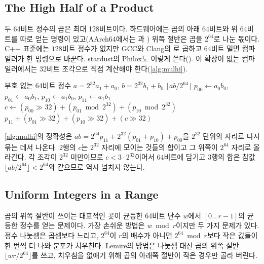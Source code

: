 \subsection{The High Half of a Product}

두 64비트 정수의 곱은 최대 128비트이다. 하드웨어에는 곱의 아래 64비트와 위 64비트를 따로 얻는 명령이 있고(AArch64에서는 과 ) 위쪽 절반은 곱을 $2^{64}$로 나눈 몫이다. C++ 표준에는 $128$비트 정수가 없지만 GCC와 Clang의 로 곱하고 $64$비트 밀면 컴파일러가  한 명령으로 바꾼다. stardust의 Philox도 이렇게 쓴다(). 이 확장이 없는 컴파일러에서는 $32$비트 조각으로 직접 계산해야 한다(\cref{alg:mulhi}).

\begin{algorithm}[htbp]
\begin{algorithmic}[1]
\Require 부호 없는 64비트 정수 $a=2^{32}a_1+a_0$, $b=2^{32}b_1+b_0$
\Ensure $\lfloor ab/2^{64}\rfloor$
\State $p_{00}\gets a_0b_0$, $p_{01}\gets a_0b_1$, $p_{10}\gets a_1b_0$, $p_{11}\gets a_1b_1$ 
\State $c\gets(p_{00}\gg32)+(p_{01}\bmod2^{32})+(p_{10}\bmod2^{32})$ 
\State \Return $p_{11}+(p_{01}\gg32)+(p_{10}\gg32)+(c\gg32)$
\end{algorithmic}
\caption{$32$비트 조각으로 곱의 위쪽 절반}
\label{alg:mulhi}
\end{algorithm}

\cref{alg:mulhi}의 정확성은 $ab=2^{64}p_{11}+2^{32}(p_{01}+p_{10})+p_{00}$을 $2^{32}$ 단위의 자리로 다시 묶는 데서 나온다. 2행의 $c$는 $2^{32}$ 자리에 모이는 것들의 합이고 그 위쪽이 $2^{64}$ 자리로 올라간다. 각 조각이 $2^{32}$ 미만이므로 $c<3\cdot2^{32}$이어서 $64$비트에 담기고 3행의 합은 참값 $\lfloor ab/2^{64}\rfloor<2^{64}$와 같으므로 역시 넘치지 않는다.

\subsection{Uniform Integers in a Range}

곱의 위쪽 절반이 쓰이는 대표적인 곳이 균등한 64비트 난수 $w$에서 $[0\,..\,r-1]$의 균등한 정수를 얻는 문제이다. 가장 손쉬운 방법은 $w\bmod r$이지만 두 가지 문제가 있다. 정수 나눗셈은 곱셈보다 느리고, $2^{64}$이 $r$의 배수가 아니면 $2^{64}\bmod r$보다 작은 값들이 한 번씩 더 나와 분포가 치우친다. Lemire의 방법은 나눗셈 대신 곱의 위쪽 절반 $\lfloor wr/2^{64}\rfloor$를 쓰고, 치우침을 없애기 위해 곱의 아래쪽 절반이 작은 경우만 골라 버린다\cite{lemire2019interval}.

